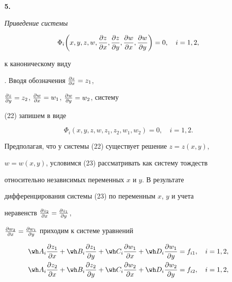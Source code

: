  


{\bf 5.} {\it Приведение системы 


\begin{equation} 


\Phi_i\bigg(x,y,z,w, \myfrac{z}{x}, \myfrac{z}{y}, \myfrac{w}{x}, 


\myfrac{w}{y} \bigg)=0,\quad i=1,2, 


\end{equation} 


к каноническому виду}. Вводя обозначения $\frac{\partial z}{\partial x}=z_1$, 


$\frac{\partial z}{\partial y}=z_2$, $\frac{\partial w}{\partial x}=w_1$, $\frac{\partial w}{\partial y}=w_2$, систему 


(22) запишем в виде 


\begin{equation} 


\Phi_i(x,y,z,w,z_1,z_2,w_1,w_2)=0,\quad i=1,2. 


\end{equation} 


Предполагая, что у системы (22) существует решение $z=z(x,y)$, 


$w=w(x,y)$, условимся (23) рассматривать как систему тождеств 


относительно независимых переменных $x$ и $y$. В результате 


дифференцирования системы (23) по переменным $x$, $y$ и учета 


неравенств $\frac{\partial z_2}{\partial x}=\frac{\partial z_1}{\partial y}$, 


$\frac{\partial w_2}{\partial x}=\frac{\partial w_1}{\partial y}$ приходим к системе уравнений 


\begin{equation} 


\begin{split} 


\wh A_i\myfrac{z_1}{x}+\wh B_i\myfrac{z_1}{y}+\wh 


C_i\myfrac{w_1}{x}+\wh D_i\myfrac{w_1}{y}&=f_{i1},\quad 


i=1,2,\\ 


% 


\wh A_i\myfrac{z_2}{x}+\wh B_i\myfrac{z_2}{y}+\wh 


C_i\myfrac{w_2}{x}+\wh D_i\myfrac{w_2}{y}&=f_{i2}, 


\quad i=1,2,


\end{split} 


\end{equation} 


